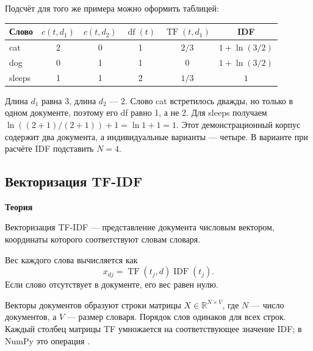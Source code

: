 \documentclass[12pt,a4paper]{article}
\newcommand{\micro}[1]{\subsection{#1}}
\newcommand{\taskhead}[1]{\par\textbf{#1}\par}
\begin{document}
Подсчёт для того же примера можно оформить таблицей:
\begin{center}
\begin{tabular}{lccccc}
Слово & $c(t,d_1)$ & $c(t,d_2)$ & $\operatorname{df}(t)$ & $\operatorname{TF}(t,d_1)$ & IDF\\\hline
cat & 2 & 0 & 1 & $2/3$ & $1+\ln(3/2)$\\
dog & 0 & 1 & 1 & $0$ & $1+\ln(3/2)$\\
sleeps & 1 & 1 & 2 & $1/3$ & $1$\\
\end{tabular}
\end{center}
Длина $d_1$ равна 3, длина $d_2$ --- 2. Слово cat встретилось дважды,
но только в одном документе, поэтому его df равно 1, а не 2.
Для sleeps получаем $\ln((2+1)/(2+1))+1=\ln1+1=1$.
Этот демонстрационный корпус содержит два документа, а индивидуальные
варианты --- четыре. В варианте при расчёте IDF подставить $N=4$.

\micro{Векторизация TF-IDF}

\taskhead{Теория}

Векторизация TF-IDF --- представление документа числовым
вектором, координаты которого соответствуют словам словаря.


Вес каждого слова вычисляется как
\[
x_{dj}=\operatorname{TF}(t_j,d)\operatorname{IDF}(t_j).
\]
Если слово отсутствует в документе, его вес равен нулю.

Векторы документов образуют строки матрицы
$X\in\mathbb{R}^{N\times V}$, где $N$ --- число документов,
а $V$ --- размер словаря. Порядок слов одинаков для всех строк.
Каждый столбец матрицы TF умножается на соответствующее
значение IDF; в NumPy это операция .

\newpage
\end{document}

